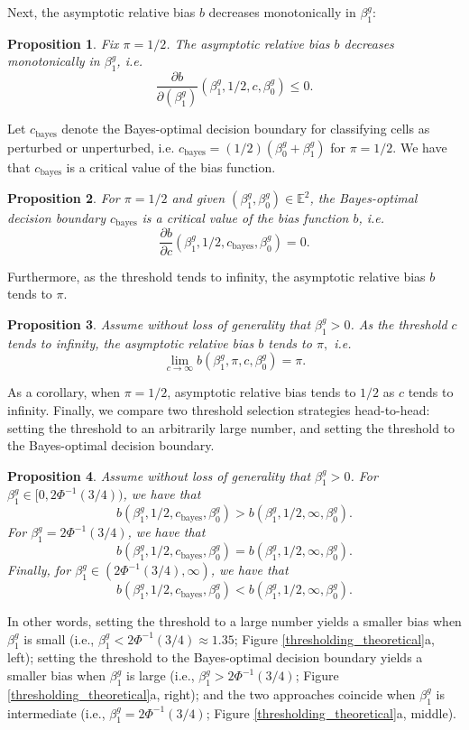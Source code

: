 \documentclass[12pt]{article}
\newtheorem{proposition}{Proposition}
\begin{document}
\begin{appendices}
\begin{refsection}
		Next, the asymptotic relative bias $b$ decreases monotonically in $\beta^g_1:$
		\begin{proposition}\label{prop:monotonic} Fix $\pi = 1/2$. The asymptotic relative bias $b$ decreases monotonically in $\beta_1^g$, i.e.
			$$\frac{\partial b}{\partial(\beta^g_1)}\left(\beta^g_1, 1/2, c, \beta^g_0\right) \leq 0.$$
		\end{proposition}
		Let $c_\textrm{bayes}$ denote the Bayes-optimal decision boundary for classifying cells as perturbed or unperturbed, i.e. $c_\textrm{bayes} = (1/2)(\beta^g_0 + \beta^g_1)$ for $\pi = 1/2$. We have that $c_\textrm{bayes}$ is a critical value of the bias function.
		\begin{proposition}\label{prop:bayes_opt}
			For $\pi = 1/2$ and given $(\beta^g_1, \beta^g_0) \in \mathbb{E}^2$, the Bayes-optimal decision boundary $c_\textrm{bayes}$ is a critical value of the bias function $b$, i.e.
			$$ \frac{\partial b}{\partial c}\left(\beta^g_1, 1/2, c_\textrm{bayes}, \beta^g_0\right) = 0.$$
		\end{proposition} Furthermore, as the threshold tends to infinity, the asymptotic relative bias $b$ tends to $\pi$.
		\begin{proposition}\label{prop:c_limit}
			Assume without loss of generality that $\beta^g_1 > 0$. As the threshold $c$ tends to infinity, the asymptotic relative bias $b$ tends to $\pi,$ i.e.
			$$ \lim_{ c \to \infty } b(\beta^g_1, \pi, c, \beta^g_0) = \pi.$$
		\end{proposition}
		As a corollary, when $\pi = 1/2$, asymptotic relative bias tends to $1/2$ as $c$ tends to infinity. Finally, we compare two threshold selection strategies head-to-head: setting the threshold to an arbitrarily large number, and setting the threshold to the Bayes-optimal decision boundary.
		\begin{proposition}\label{prop:comparison} Assume without loss of generality that $\beta^g_1 > 0$. For $\beta^g_1 \in [0, 2\Phi^{-1}(3/4))$, we have that $$b(\beta^g_1, 1/2, c_\textrm{bayes}, \beta^g_0) > b(\beta^g_1, 1/2, \infty, \beta^g_0).$$ For $\beta^g_1 = 2\Phi^{-1}(3/4)$, we have that $$b(\beta^g_1, 1/2, c_\textrm{bayes}, \beta^g_0) = b(\beta^g_1, 1/2, \infty, \beta^g_0).$$ Finally, for $\beta^g_1 \in (2\Phi^{-1}(3/4), \infty)$, we have that $$b(\beta^g_1, 1/2, c_\textrm{bayes}, \beta^g_0) < b(\beta^g_1, 1/2, \infty, \beta^g_0).$$
		\end{proposition}
		In other words, setting the threshold to a large number yields a smaller bias when $\beta^g_1$ is small (i.e., $\beta^g_1 < 2\Phi^{-1}(3/4) \approx 1.35$; Figure \ref{thresholding_theoretical}a, left); setting the threshold to the Bayes-optimal decision boundary yields a smaller bias when $\beta^g_1$ is large (i.e., $\beta^g_1 > 2\Phi^{-1}(3/4)$; Figure \ref{thresholding_theoretical}a, right); and the two approaches coincide when $\beta^g_1$ is intermediate (i.e., $\beta^g_1 = 2\Phi^{-1}(3/4)$; Figure \ref{thresholding_theoretical}a, middle).
		

\end{refsection}
\end{appendices}
\end{document}
